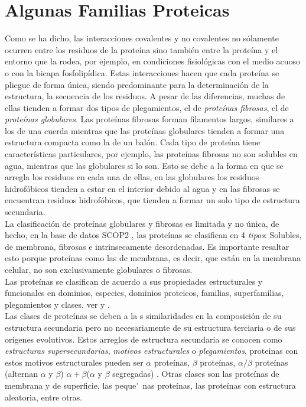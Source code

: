 \section{Algunas Familias Proteicas}

Como se ha dicho, las interacciones  covalentes y no covalentes no s\'{o}lamente ocurren entre los residuos de la prote\'{i}na sino 
tambi\'{e}n entre la prote\'{i}na y el entorno que la rodea, por ejemplo, en condiciones fisiol\'{o}gicas con el medio acuoso o con 
la bicapa fosfolip\'{i}dica. Estas interacciones hacen que cada prote\'{i}na se pliegue de forma \'{u}nica, siendo predominante 
para la determinaci\'{o}n de la estructura, la secuencia de los residuos. A 
pesar de las diferencias, muchas de ellas tienden a formar dos tipos de plegamientos, el de \textit{prote\'{i}nas fibrosas}, el de 
\textit{prote\'{i}nas globulares}. Las prote\'{i}nas fibrosas forman filamentos largos, similares a los de una cuerda mientras que las 
prote\'{i}nas globulares tienden a formar una estructura compacta como la de un bal\'{o}n. Cada tipo de prote\'{i}na tiene 
caracter\'{i}sticas particulares, por ejemplo, las prote\'{i}nas fibrosas no son solubles en agua, mientras que las globulares si 
lo son. Esto se debe a la forma en que se arregla los residuos en cada una de ellas, en las globulares los residuos 
hidrof\'{o}bicos tienden a estar en el interior debido al agua y en las fibrosas se encuentran residuos hidrof\'{o}bicos, que tienden a formar un solo tipo de estructura secundaria.\\

La clasificaci\'{o}n de prote\'{i}nas globulares y fibrosas es limitada y no \'{u}nica, de hecho, en la base de datos SCOP2 \cite{Andreeva2014}, las 
prote\'{i}nas se clasifican en 4 \textit{tipos}: Solubles, de membrana, fibrosas e intrinsecamente desordenadas. Es importante resaltar esto porque prote\'{i}nas como las de membrana, es decir, que est\'{a}n en la  membrana celular, no son exclusivamente globulares o fibrosas.\\
Las prote\'{i}nas se clasifican de acuerdo a sus propiedades estructurales y funcionales en dominios, especies, dominios proteicos, familias, superfamilias, plegamientos y clases. ver \cite{Hubbard1999} y \cite{Andreeva2014}.\\

Las clases de prote\'{i}nas se deben a la s similaridades en la composici\'{o}n de su estructura secundaria pero no necesariamente de su estructura terciaria o de sus or\'{i}genes evolutivos. Estos arreglos de estructura secundaria se conocen como \textit{estructuras supersecundarias}, \textit{motivos estructurales} o \textit{plegamientos}, proteinas con estos motivos estructurales pueden ser $\alpha$ prote\'{i}nas, $\beta$ prote\'{i}nas, $\alpha/\beta$ prote\'{i}nas (alternan $\alpha$ y $\beta$) $\alpha+\beta$($\alpha$ y $\beta$ segregadas) . Otras clases son las prote\'{i}nas de membrana y de superficie, las peque\'~{n}as prote\'{i}nas, las prote\'{i}nas con estructura aleatoria, entre otras.\\

